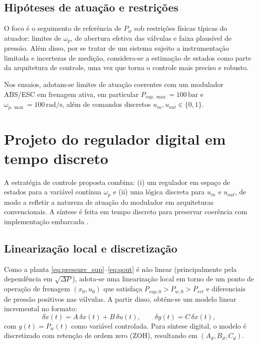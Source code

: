 \documentclass[a4paper]{ifacconf}
\begin{document}
\subsection{Hipóteses de atuação e restrições}
O foco é o seguimento de referência de $P_w$ sob restrições físicas típicas do atuador: limites de $\omega_p$, de abertura efetiva das válvulas e faixa plausível de pressão. Além disso, por se tratar de um sistema sujeito a instrumentação limitada e incertezas de medição, considera-se a estimação de estados como parte da arquitetura de controle, uma vez que torna o controle mais preciso e robusto.

Nos ensaios, adotam-se limites de atuação coerentes com um modulador ABS/ESC em frenagem ativa, em particular $P_{sup,\max}=100\,\mathrm{bar}$ e $\omega_{p,\max}=100\,\mathrm{rad/s}$, além de comandos discretos $u_{in},u_{out}\in\{0,1\}$.

\section{Projeto do regulador digital em tempo discreto}
\label{sec:controle}
A estratégia de controle proposta combina: (i) um regulador em espaço de estados para a variável contínua $\omega_p$ e (ii) uma lógica discreta para $u_{in}$ e $u_{out}$, de modo a refletir a natureza de atuação do modulador em arquiteturas convencionais. A síntese é feita em tempo discreto para preservar coerência com implementação embarcada \cite{FranklinPowellWorkman1998,Ogata1997}.

\subsection{Linearização local e discretização}
Como a planta \eqref{eq:pressure_sup}--\eqref{eq:qout} é não linear (principalmente pela dependência em $\sqrt{\Delta P}$), adota-se uma linearização local em torno de um ponto de operação de frenagem $(x_0,u_0)$ que satisfaça $P_{sup,0}>P_{w,0}>P_{ret}$ e diferenciais de pressão positivos nas válvulas. A partir disso, obtém-se um modelo linear incremental no formato:
\begin{equation}
   \delta \dot{x}(t)=A\,\delta x(t)+B\,\delta u(t),
   \qquad
   \delta y(t)=C\,\delta x(t),
   \label{eq:lin_ss}
\end{equation}
com $y(t)=P_w(t)$ como variável controlada. Para síntese digital, o modelo é discretizado com retenção de ordem zero (ZOH), resultando em $(A_d,B_d,C_d)$.
\end{document}
